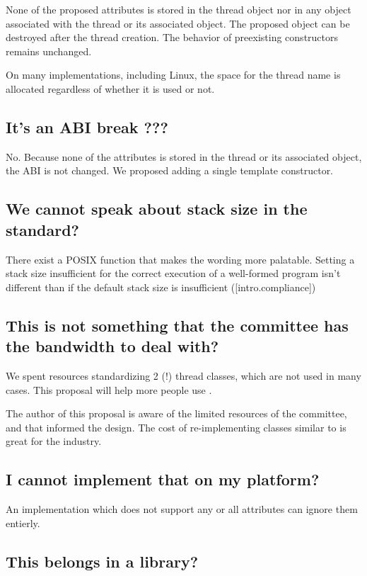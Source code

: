 \documentclass{wg21}
\begin{document}
None of the proposed attributes is stored in the thread object nor in any object associated with the thread or its associated  object.
The proposed  object can be destroyed after the thread creation.
The behavior of preexisting constructors remains unchanged.

On many implementations, including Linux, the space for the thread name is allocated regardless of whether it is used or not.

\subsection{It's an ABI break ???}

No.
Because none of the attributes is stored in the thread or its associated  object, the ABI is not changed.
We proposed adding a single template constructor.


\subsection{We cannot speak about stack size in the standard?}
There exist a POSIX function that makes the wording more palatable.
Setting a stack size insufficient for the correct execution of a well-formed program isn't different
than if the default stack size is insufficient ([intro.compliance])

\subsection{This is not something that the committee has the bandwidth to deal with?}

We spent resources standardizing 2 (!) thread classes, which are not used in many cases.
This proposal will help more people use .

The author of this proposal is aware of the limited resources of the committee, and that informed the design.
The cost of re-implementing classes similar to  is great for the industry.

\subsection{I cannot implement that on my platform?}

An implementation which does not support any or all attributes can ignore them entierly.


\subsection{This belongs in a library?}
\end{document}
